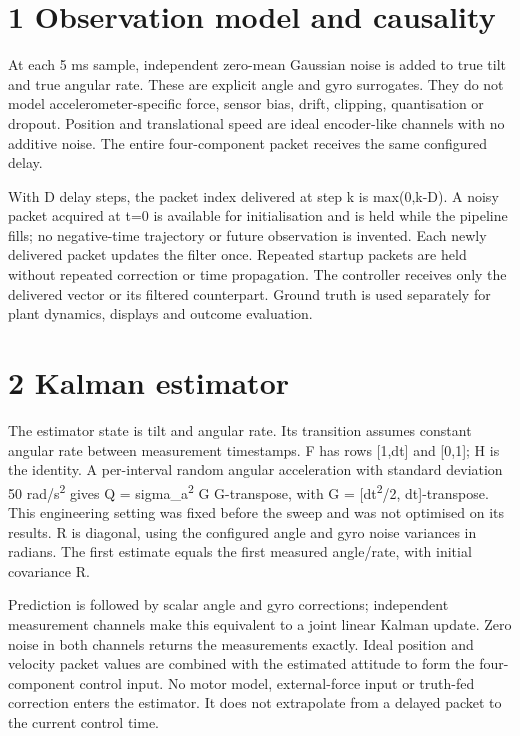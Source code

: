 \documentclass[11pt,a4paper]{article}
\begin{document}
\section*{1 Observation model and causality}
At each 5 ms sample, independent zero-mean Gaussian noise is added to true tilt and true angular rate. These are explicit angle and gyro surrogates. They do not model accelerometer-specific force, sensor bias, drift, clipping, quantisation or dropout. Position and translational speed are ideal encoder-like channels with no additive noise. The entire four-component packet receives the same configured delay.

With D delay steps, the packet index delivered at step k is max(0,k-D). A noisy packet acquired at t=0 is available for initialisation and is held while the pipeline fills; no negative-time trajectory or future observation is invented. Each newly delivered packet updates the filter once. Repeated startup packets are held without repeated correction or time propagation. The controller receives only the delivered vector or its filtered counterpart. Ground truth is used separately for plant dynamics, displays and outcome evaluation.

\section*{2 Kalman estimator}
The estimator state is tilt and angular rate. Its transition assumes constant angular rate between measurement timestamps. F has rows [1,dt] and [0,1]; H is the identity. A per-interval random angular acceleration with standard deviation 50 rad/s\textsuperscript{2} gives Q = sigma\_a\textsuperscript{2} G G-transpose, with G = [dt\textsuperscript{2}/2, dt]-transpose. This engineering setting was fixed before the sweep and was not optimised on its results. R is diagonal, using the configured angle and gyro noise variances in radians. The first estimate equals the first measured angle/rate, with initial covariance R.

Prediction is followed by scalar angle and gyro corrections; independent measurement channels make this equivalent to a joint linear Kalman update. Zero noise in both channels returns the measurements exactly. Ideal position and velocity packet values are combined with the estimated attitude to form the four-component control input. No motor model, external-force input or truth-fed correction enters the estimator. It does not extrapolate from a delayed packet to the current control time.
\end{document}
